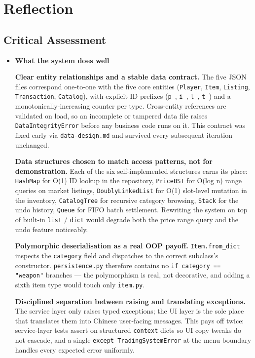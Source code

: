 \documentclass[11pt,a4paper]{article}
\begin{document}
\vspace{1\baselineskip}
\section{Reflection}
\label{sec:reflection}

\subsection{Critical Assessment}
\begin{itemize}
    \item \textbf{What the system does well}

    \textbf{Clear entity relationships and a stable data contract.}
    The five JSON files correspond one-to-one with the five core entities (\texttt{Player}, \texttt{Item}, \texttt{Listing}, \texttt{Transaction}, \texttt{Catalog}), with explicit ID prefixes (\texttt{p\_}, \texttt{i\_}, \texttt{l\_}, \texttt{t\_}) and a monotonically-increasing counter per type. Cross-entity references are validated on load, so an incomplete or tampered data file raises \texttt{DataIntegrityError} before any business code runs on it. This contract was fixed early via \texttt{data-design.md} and survived every subsequent iteration unchanged.

    \textbf{Data structures chosen to match access patterns, not for demonstration.}
    Each of the six self-implemented structures earns its place: \texttt{HashMap} for O(1) ID lookup in the repository, \texttt{PriceBST} for O(log n) range queries on market listings, \texttt{DoublyLinkedList} for O(1) slot-level mutation in the inventory, \texttt{CatalogTree} for recursive category browsing, \texttt{Stack} for the undo history, \texttt{Queue} for FIFO batch settlement. Rewriting the system on top of built-in \texttt{list} / \texttt{dict} would degrade both the price range query and the undo feature noticeably.

    \textbf{Polymorphic deserialisation as a real OOP payoff.}
    \texttt{Item.from\_dict} inspects the \texttt{category} field and dispatches to the correct subclass's constructor. \texttt{persistence.py} therefore contains no \texttt{if category == "weapon"} branches — the polymorphism is real, not decorative, and adding a sixth item type would touch only \texttt{item.py}.

    \textbf{Disciplined separation between raising and translating exceptions.}
    The service layer only raises typed exceptions; the UI layer is the sole place that translates them into Chinese user-facing messages. This pays off twice: service-layer tests assert on structured \texttt{context} dicts so UI copy tweaks do not cascade, and a single \texttt{except TradingSystemError} at the menu boundary handles every expected error uniformly.


\end{itemize}
\end{document}
